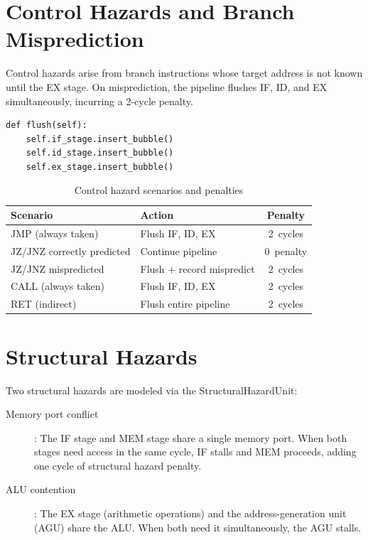 \documentclass[12pt,a4paper,twoside]{book}
\theoremstyle{trinarytheorem}
\theoremstyle{trinarydefinition}
\newcommand{\code}[1]{\textsf{#1}}
\begin{document}
\section{Control Hazards and Branch Misprediction}

Control hazards arise from branch instructions whose target address
is not known until the EX stage. On misprediction, the pipeline flushes
IF, ID, and EX simultaneously, incurring a 2-cycle penalty.

\begin{verbatim}
def flush(self):
    self.if_stage.insert_bubble()
    self.id_stage.insert_bubble()
    self.ex_stage.insert_bubble()
\end{verbatim}

\begin{table}[H]
\centering
\caption{Control hazard scenarios and penalties}
\label{tab:ctrlhazards}
\begin{tabular}{llc}
\toprule
Scenario & Action & Penalty \\
\midrule
JMP (always taken) & Flush IF, ID, EX & 2~cycles \\
JZ/JNZ correctly predicted & Continue pipeline & 0~penalty \\
JZ/JNZ mispredicted & Flush + record mispredict & 2~cycles \\
CALL (always taken) & Flush IF, ID, EX & 2~cycles \\
RET (indirect) & Flush entire pipeline & 2~cycles \\
\bottomrule
\end{tabular}
\end{table}

\section{Structural Hazards}

Two structural hazards are modeled via the \code{StructuralHazardUnit}:

\begin{description}
    \item[Memory port conflict]: The IF stage and MEM stage share a single
          memory port. When both stages need access in the same cycle, IF
          stalls and MEM proceeds, adding one cycle of structural hazard
          penalty.
    \item[ALU contention]: The EX stage (arithmetic operations) and the
          address-generation unit (AGU) share the ALU. When both need it
          simultaneously, the AGU stalls.
\end{description}
\end{document}

